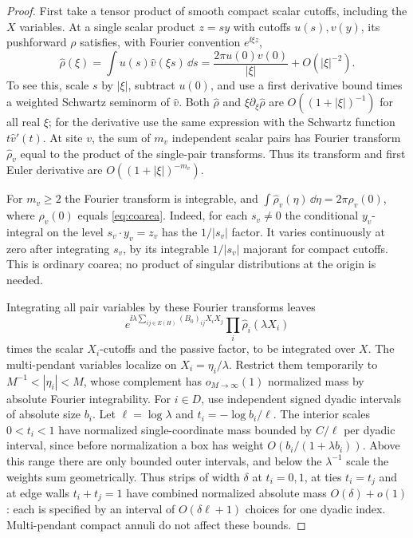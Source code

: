 \begin{proof}
First take a tensor product of smooth compact scalar cutoffs, including the \(X\) variables. At a single scalar product \(z=sy\) with cutoffs \(u(s),v(y)\), its pushforward \(\rho\) satisfies, with Fourier convention \(e^{\ii\xi z}\),
\[
  \widehat\rho(\xi)
       =\int u(s)\widehat v(\xi s)\,\dd s
       =\frac{2\pi u(0)v(0)}{|\xi|}+O(|\xi|^{-2}).
\]
To see this, scale \(s\) by \(|\xi|\), subtract \(u(0)\), and use a first derivative bound times a weighted Schwartz seminorm of \(\widehat v\). Both \(\widehat\rho\) and \(\xi\partial_\xi\widehat\rho\) are \(O((1+|\xi|)^{-1})\) for all real \(\xi\); for the derivative use the same expression with the Schwartz function \(t\widehat v'(t)\). At site \(v\), the sum of \(m_v\) independent scalar pairs has Fourier transform \(\widehat\rho_v\) equal to the product of the single-pair transforms. Thus its transform and first Euler derivative are \(O((1+|\xi|)^{-m_v})\).

For \(m_v\ge2\) the Fourier transform is integrable, and
\(\int\widehat\rho_v(\eta)\,\dd\eta=2\pi\rho_v(0)\), where \(\rho_v(0)\) equals \eqref{eq:coarea}. Indeed, for each \(s_v\ne0\) the conditional \(y_v\)-integral on the level \(s_v\cdot y_v=z_v\) has the \(1/|s_v|\) factor. It varies continuously at zero after integrating \(s_v\), by its integrable \(1/|s_v|\) majorant for compact cutoffs. This is ordinary coarea; no product of singular distributions at the origin is needed.

Integrating all pair variables by these Fourier transforms leaves
\[
  e^{\ii\lambda\sum_{ij\in E(H)}(B_0)_{ij}X_iX_j}
              \prod_i \widehat\rho_i(\lambda X_i)
\]
times the scalar \(X_i\)-cutoffs and the passive factor, to be integrated over \(X\). The multi-pendant variables localize on \(X_i=\eta_i/\lambda\). Restrict them temporarily to \(M^{-1}<|\eta_i|<M\), whose complement has \(o_{M\to\infty}(1)\) normalized mass by absolute Fourier integrability. For \(i\in D\), use independent signed dyadic intervals of absolute size \(b_i\). Let \(\ell=\log\lambda\) and \(t_i=-\log b_i/\ell\). The interior scales \(0<t_i<1\) have normalized single-coordinate mass bounded by \(C/\ell\) per dyadic interval, since before normalization a box has weight \(O(b_i/(1+\lambda b_i))\). Above this range there are only bounded outer intervals, and below the \(\lambda^{-1}\) scale the weights sum geometrically. Thus strips of width \(\delta\) at \(t_i=0,1\), at ties \(t_i=t_j\) and at edge walls \(t_i+t_j=1\) have combined normalized absolute mass \(O(\delta)+o(1)\): each is specified by an interval of \(O(\delta\ell+1)\) choices for one dyadic index. Multi-pendant compact annuli do not affect these bounds.


\end{proof}

